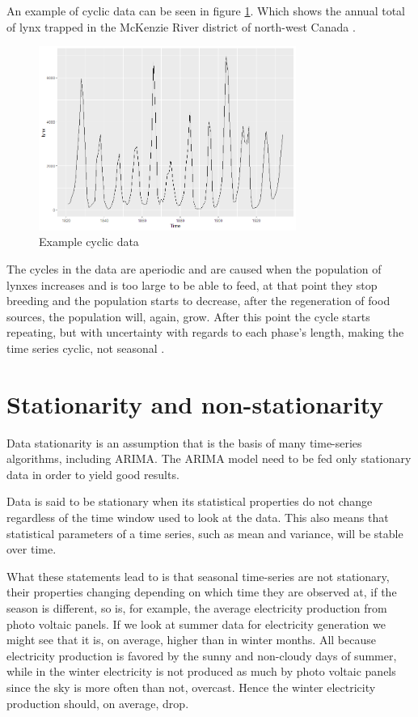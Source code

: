 \documentclass[12pt,a4paper,titlepage]{report}
\begin{document}
An example of cyclic data can be seen in figure \ref{dlynx}. Which shows the annual total of lynx trapped in the McKenzie River district of north-west Canada \cite{fpp2stationarity}.
\begin{figure}[h]
    \centering
    \includegraphics[width=0.75\textwidth]{dlynx}
    \caption{Example cyclic data}
    \label{dlynx}
\end{figure}

The cycles in the data are aperiodic and are caused when the population of lynxes increases and is too large to be able to feed, at that point they stop breeding and the population starts to decrease, after the regeneration of food sources, the population will, again, grow. After this point the cycle starts repeating, but with uncertainty with regards to each phase's length, making the time series cyclic, not seasonal \cite{fpp2stationarity}.

\section{Stationarity and non-stationarity} \label{stationaritysection}

Data stationarity is an assumption that is the basis of many time-series algorithms, including ARIMA. The ARIMA model need to be fed only stationary data in order to yield good results.

Data is said to be stationary when its statistical properties do not change regardless of the time window used to look at the data. This also means that statistical parameters of a time series, such as mean and variance, will be stable over time. \cite{fpp2stationarity}

What these statements lead to is that seasonal time-series are not stationary, their properties changing depending on which time they are observed at, if the season is different, so is, for example, the average electricity production from photo voltaic panels. If we look at summer data for electricity generation we might see that it is, on average, higher than in winter months. All because electricity production is favored by the sunny and non-cloudy days of summer, while in the winter electricity is not produced as much by photo voltaic panels since the sky is more often than not, overcast. Hence the winter electricity production should, on average, drop.
\end{document}
